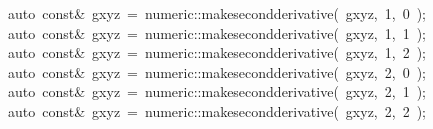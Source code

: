 \documentclass[9pt,onside]{article}
\newcommand{\hlstd}[1]{\textcolor[rgb]{0.2,0,0.4}{#1}}
\newcommand{\hlnum}[1]{\textcolor[rgb]{0.2,0.73,0.02}{#1}}
\newcommand{\hlopt}[1]{\textcolor[rgb]{0.33,0.33,0.33}{#1}}
\newcommand{\hlkwb}[1]{\textcolor[rgb]{0.96,0.55,0.14}{#1}}
\newcommand{\hlkwc}[1]{\textcolor[rgb]{0,0,1}{#1}}
\newcommand{\hlkwd}[1]{\textcolor[rgb]{0.82,0.11,0.93}{#1}}
\begin{document}
{\hlstd{}\hlstd{\ \ \ \ }\hlstd{}\hlkwc{auto\ }\hlstd{}\hlkwb{const}\hlstd{}\hlopt{\&\ }\hlstd{gxyz\ }\hlopt{=\ }\hlstd{numeric}\hlopt{::}\hlstd{}\hlkwd{make\textunderscore second\textunderscore derivative}\hlstd{}\hlopt{(\ }\hlstd{gxyz}\hlopt{,\ }\hlstd{}\hlnum{1}\hlstd{}\hlopt{,\ }\hlstd{}\hlnum{0\ }\hlstd{}\hlopt{);}\hspace*{\fill}\\
\hlstd{}\hlstd{\ \ \ \ }\hlstd{}\hlkwc{auto\ }\hlstd{}\hlkwb{const}\hlstd{}\hlopt{\&\ }\hlstd{gxyz\ }\hlopt{=\ }\hlstd{numeric}\hlopt{::}\hlstd{}\hlkwd{make\textunderscore second\textunderscore derivative}\hlstd{}\hlopt{(\ }\hlstd{gxyz}\hlopt{,\ }\hlstd{}\hlnum{1}\hlstd{}\hlopt{,\ }\hlstd{}\hlnum{1\ }\hlstd{}\hlopt{);}\hspace*{\fill}\\
\hlstd{}\hlstd{\ \ \ \ }\hlstd{}\hlkwc{auto\ }\hlstd{}\hlkwb{const}\hlstd{}\hlopt{\&\ }\hlstd{gxyz\ }\hlopt{=\ }\hlstd{numeric}\hlopt{::}\hlstd{}\hlkwd{make\textunderscore second\textunderscore derivative}\hlstd{}\hlopt{(\ }\hlstd{gxyz}\hlopt{,\ }\hlstd{}\hlnum{1}\hlstd{}\hlopt{,\ }\hlstd{}\hlnum{2\ }\hlstd{}\hlopt{);}\hspace*{\fill}\\
\hlstd{}\hlstd{\ \ \ \ }\hlstd{}\hlkwc{auto\ }\hlstd{}\hlkwb{const}\hlstd{}\hlopt{\&\ }\hlstd{gxyz\ }\hlopt{=\ }\hlstd{numeric}\hlopt{::}\hlstd{}\hlkwd{make\textunderscore second\textunderscore derivative}\hlstd{}\hlopt{(\ }\hlstd{gxyz}\hlopt{,\ }\hlstd{}\hlnum{2}\hlstd{}\hlopt{,\ }\hlstd{}\hlnum{0\ }\hlstd{}\hlopt{);}\hspace*{\fill}\\
\hlstd{}\hlstd{\ \ \ \ }\hlstd{}\hlkwc{auto\ }\hlstd{}\hlkwb{const}\hlstd{}\hlopt{\&\ }\hlstd{gxyz\ }\hlopt{=\ }\hlstd{numeric}\hlopt{::}\hlstd{}\hlkwd{make\textunderscore second\textunderscore derivative}\hlstd{}\hlopt{(\ }\hlstd{gxyz}\hlopt{,\ }\hlstd{}\hlnum{2}\hlstd{}\hlopt{,\ }\hlstd{}\hlnum{1\ }\hlstd{}\hlopt{);}\hspace*{\fill}\\
\hlstd{}\hlstd{\ \ \ \ }\hlstd{}\hlkwc{auto\ }\hlstd{}\hlkwb{const}\hlstd{}\hlopt{\&\ }\hlstd{gxyz\ }\hlopt{=\ }\hlstd{numeric}\hlopt{::}\hlstd{}\hlkwd{make\textunderscore second\textunderscore derivative}\hlstd{}\hlopt{(\ }\hlstd{gxyz}\hlopt{,\ }\hlstd{}\hlnum{2}\hlstd{}\hlopt{,\ }\hlstd{}\hlnum{2\ }\hlstd{}\hlopt{);}\hspace*{\fill}\\
}
\end{document}
